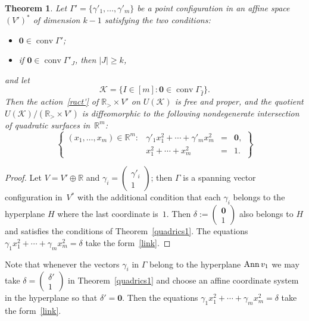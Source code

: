 \documentclass[a4paper]{amsart}
\newtheorem{theorem}{Theorem}[section]
\theoremstyle{definition}
\theoremstyle{remark}
\numberwithin{equation}{section}
\def\R{\mathbb R}
\def\R{\mathbb R}
\def\sK{\mathcal K}
\newcommand{\mb}[1]{{\textbf {\textit#1}}}
\renewcommand{\ge}{\geqslant}
\def\Ann{\mathop{\mathrm{Ann}}}
\def\conv{\mathop{\mathrm{conv}}}
\newcommand{\<}{\langle}
\renewcommand{\>}{\rangle}
\begin{document}
\begin{theorem}\label{quadrics2}
Let $\Gamma'=\{\gamma'_1,\ldots,\gamma'_m\}$ be a point configuration in an affine space $(V')^*$ of dimension $k-1$ satisfying the two conditions:
\begin{itemize}
\item[(a)] $\mathbf{0}\in\conv\Gamma'$;\\[-0.7\baselineskip]

\item[(b)]
if $\mathbf{0}\in\conv\Gamma'_J$, then $|J|\ge k$,
\end{itemize}
and let
\begin{equation}\label{Kgamma}
  \sK=\{I\in[m]\colon \mathbf{0}\in\conv\Gamma_{\widehat I}\}.
\end{equation}
Then the action~\eqref{ract'} of $\R_>\times V'$ on $U(\sK)$ is free and proper, and the quotient $U(\sK)/(\R_>\times V')$ is diffeomorphic to the following nondegenerate intersection of quadratic surfaces  in~$\R^m$:
\begin{equation}\label{link}
  \left\{\begin{array}{lrcl}
  (x_1,\ldots,x_m)\in\R^m\colon&
  \gamma'_1x_1^2+\cdots+\gamma'_m x_m^2&=&\mathbf{0},\\[1mm]
  &x_1^2+\cdots+x_m^2&=&1.
  \end{array}\right\}
\end{equation}
\end{theorem}
\begin{proof}
Let $V=V'\oplus\R$ and $\gamma_i=\begin{pmatrix}\gamma'_i\\1\end{pmatrix}$; then $\Gamma$ is a spanning vector configuration in~$V^*$ with the additional condition that each $\gamma_i$ belongs to the hyperplane $H$ where the last coordinate is~$1$. Then $\delta:=\begin{pmatrix}\mathbf{0}\\1\end{pmatrix}$ also belongs to $H$ and satisfies the conditions of Theorem~\ref{quadrics1}. The equations 
$\gamma_1x_1^2+\cdots+\gamma_mx_m^2=\delta$ take the form~\eqref{link}.
\end{proof}

Note that whenever the vectors $\gamma_i$ in $\Gamma$ belong to the hyperplane $\Ann\mb v_1$ we may take 
$\delta=\begin{pmatrix}\delta'\\1\end{pmatrix}$ in Theorem~\ref{quadrics1} and choose an affine coordinate system in the hyperplane so that $\delta'=\mathbf 0$. Then the equations 
$\gamma_1x_1^2+\cdots+\gamma_mx_m^2=\delta$ take the form~\eqref{link}.
\end{document}
